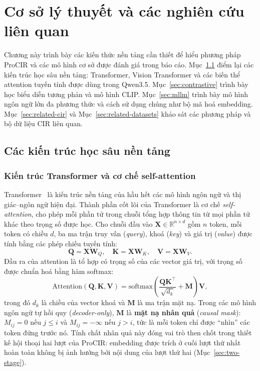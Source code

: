 \chapter{Cơ sở lý thuyết và các nghiên cứu liên quan}\label{chapter:background}
\pagestyle{fancy}

Chương này trình bày các kiến thức nền tảng cần thiết để hiểu phương pháp ProCIR và các mô hình cơ sở được đánh giá trong báo cáo. Mục~\ref{sec:architectures} điểm lại các kiến trúc học sâu nền tảng: Transformer, Vision Transformer và các biến thể attention tuyến tính được dùng trong Qwen3.5. Mục~\ref{sec:contrastive} trình bày học biểu diễn tương phản và mô hình CLIP. Mục~\ref{sec:mllm} trình bày mô hình ngôn ngữ lớn đa phương thức và cách sử dụng chúng như bộ mã hoá embedding. Mục~\ref{sec:related-cir} và Mục~\ref{sec:related-datasets} khảo sát các phương pháp và bộ dữ liệu CIR liên quan.

\section{Các kiến trúc học sâu nền tảng}\label{sec:architectures}

\subsection{Kiến trúc Transformer và cơ chế self-attention}

Transformer~\cite{vaswani2017attention} là kiến trúc nền tảng của hầu hết các mô hình ngôn ngữ và thị giác--ngôn ngữ hiện đại. Thành phần cốt lõi của Transformer là cơ chế \emph{self-attention}, cho phép mỗi phần tử trong chuỗi tổng hợp thông tin từ mọi phần tử khác theo trọng số được học. Cho chuỗi đầu vào $\mathbf{X} \in \mathbb{R}^{n \times d}$ gồm $n$ token, mỗi token có chiều $d$, ba ma trận truy vấn (\emph{query}), khoá (\emph{key}) và giá trị (\emph{value}) được tính bằng các phép chiếu tuyến tính:
\begin{equation}
    \mathbf{Q} = \mathbf{X}\mathbf{W}_Q, \quad \mathbf{K} = \mathbf{X}\mathbf{W}_K, \quad \mathbf{V} = \mathbf{X}\mathbf{W}_V.
\end{equation}
Đầu ra của attention là tổ hợp có trọng số của các vector giá trị, với trọng số được chuẩn hoá bằng hàm softmax:
\begin{equation}
    \mathrm{Attention}(\mathbf{Q}, \mathbf{K}, \mathbf{V}) = \mathrm{softmax}\!\left(\frac{\mathbf{Q}\mathbf{K}^\top}{\sqrt{d_k}} + \mathbf{M}\right)\mathbf{V},
    \label{eq:attention}
\end{equation}
trong đó $d_k$ là chiều của vector khoá và $\mathbf{M}$ là ma trận mặt nạ. Trong các mô hình ngôn ngữ tự hồi quy (\emph{decoder-only}), $\mathbf{M}$ là \textbf{mặt nạ nhân quả} (\emph{causal mask}): $M_{ij} = 0$ nếu $j \le i$ và $M_{ij} = -\infty$ nếu $j > i$, tức là mỗi token chỉ được ``nhìn'' các token đứng trước nó. Tính chất nhân quả này đóng vai trò then chốt trong thiết kế hội thoại hai lượt của ProCIR: embedding được trích ở cuối lượt thứ nhất hoàn toàn không bị ảnh hưởng bởi nội dung của lượt thứ hai (Mục~\ref{sec:two-stage}).

